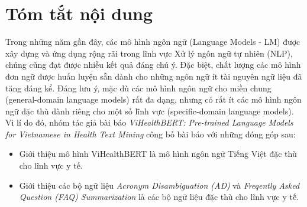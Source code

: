 \section{Tóm tắt nội dung}
Trong những năm gần đây, các mô hình ngôn ngữ (Language Models - LM) được xây dựng và ứng dụng rộng rãi trong lĩnh vực Xử lý ngôn ngữ tự nhiên (NLP), chúng cũng đạt được nhiều kết quả đáng chú ý. Đặc biệt, chất lượng các mô hình đơn ngữ được huấn luyện sẵn dành cho những ngôn ngữ ít tài nguyên ngữ liệu đã tăng đáng kể. Đáng lưu ý, mặc dù các mô hình ngôn ngữ cho miền chung (general-domain language models) rất đa dạng, nhưng có rất ít các mô hình ngôn ngữ đặc thù dành riêng cho một số lĩnh vực (specific-domain language models). Vì lí do đó, nhóm tác giả bài báo \textit{ViHealthBERT: Pre-trained Language Models for Vietnamese in Health Text Mining}\cite{minh-EtAl:2022:LREC} công bố bài báo với những đóng góp sau:
\begin{itemize}
\item Giới thiệu mô hình ViHealthBERT là mô hình ngôn ngữ Tiếng Việt đặc thù cho lĩnh vực y tế.
\item Giới thiệu các bộ ngữ liệu \textit{Acronym Disambiguation (AD)} và \textit{Freqently Asked Question (FAQ) Summarization} là các bộ ngữ liệu đặc thù cho lĩnh vực y tế.
\end{itemize}
